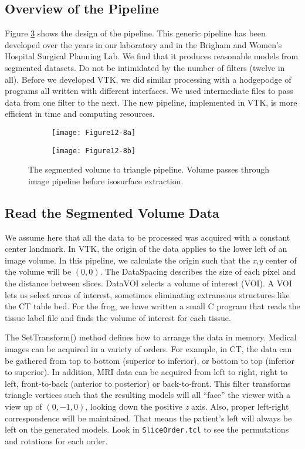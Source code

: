 \subsection{Overview of the Pipeline}

Figure \ref{fig:Figure12-8} shows the design of the pipeline. This generic pipeline has been developed over the years in our laboratory and in the Brigham and Women's Hospital Surgical Planning Lab. We find that it produces reasonable models from segmented datasets. Do not be intimidated by the number of filters (twelve in all). Before we developed VTK, we did similar processing with a hodgepodge of programs all written with different interfaces. We used intermediate files to pass data from one filter to the next. The new pipeline, implemented in VTK, is more efficient in time and computing resources.

\begin{figure}[htb]
	\begin{subfigure}[h]{0.48\linewidth}
		\texttt{[image: Figure12-8a]}
		\caption*{}
		\label{fig:Figure12-8a}
	\end{subfigure}
	\hfill
	\begin{subfigure}[h]{0.48\linewidth}
		\texttt{[image: Figure12-8b]}
		\caption*{}
		\label{fig:Figure12-8b}
	\end{subfigure}
	\caption{The segmented volume to triangle pipeline. Volume passes through image pipeline before isosurface extraction.}\label{fig:Figure12-8}
\end{figure}

\subsection{Read the Segmented Volume Data}

We assume here that all the data to be processed was acquired with a constant center landmark. In VTK, the origin of the data applies to the lower left of an image volume. In this pipeline, we calculate the origin such that the \emph{x,y} center of the volume will be $(0,0)$. The DataSpacing describes the size of each pixel and the distance between slices. DataVOI selects a volume of interest (VOI). A VOI lets us select areas of interest, sometimes eliminating extraneous structures like the CT table bed. For the frog, we have written a small C program that reads the tissue label file and finds the volume of interest for each tissue.

The SetTransform() method defines how to arrange the data in memory. Medical images can be acquired in a variety of orders. For example, in CT, the data can be gathered from top to bottom (superior to inferior), or bottom to top (inferior to superior). In addition, MRI data can be acquired from left to right, right to left, front-to-back (anterior to posterior) or back-to-front. This filter transforms triangle vertices such that the resulting models will all ``face'' the viewer with a view up of $(0,-1,0)$, looking down the positive \emph{z} axis. Also, proper left-right correspondence will be maintained. That means the patient's left will always be left on the generated models. Look in \texttt{SliceOrder.tcl} to see the permutations and rotations for each order.

